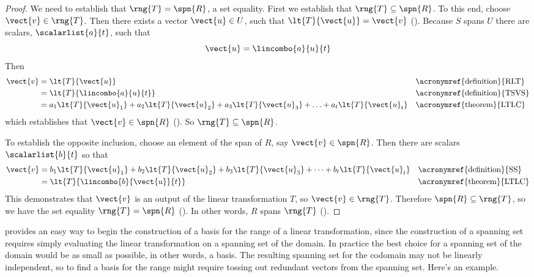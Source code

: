 %
\begin{proof}
We need to establish that $\rng{T}=\spn{R}$, a set equality.  First we establish that $\rng{T}\subseteq\spn{R}$.  To this end, choose $\vect{v}\in\rng{T}$.  Then there exists a vector $\vect{u}\in U$, such that $\lt{T}{\vect{u}}=\vect{v}$ ().  Because $S$ spans $U$ there are scalars, $\scalarlist{a}{t}$, such that
%
\begin{equation*}
\vect{u}=\lincombo{a}{u}{t}
\end{equation*}
%
Then
%
\begin{align*}
\vect{v}
&=\lt{T}{\vect{u}}&&\text{\acronymref{definition}{RLT}}\\
&=\lt{T}{\lincombo{a}{u}{t}}&&\text{\acronymref{definition}{TSVS}}\\
&=a_1\lt{T}{\vect{u}_1}+a_2\lt{T}{\vect{u}_2}+a_3\lt{T}{\vect{u}_3}+\ldots+a_t\lt{T}{\vect{u}_t}&&\text{\acronymref{theorem}{LTLC}}\\
\end{align*}
%
which establishes that $\vect{v}\in\spn{R}$ ().  So $\rng{T}\subseteq\spn{R}$.\par
%
To establish the opposite inclusion, choose an element of the span of $R$, say $\vect{v}\in\spn{R}$.  Then there are scalars $\scalarlist{b}{t}$ so that
%
\begin{align*}
\vect{v}
&=b_1\lt{T}{\vect{u}_1}+b_2\lt{T}{\vect{u}_2}+b_3\lt{T}{\vect{u}_3}+\cdots+b_t\lt{T}{\vect{u}_t}
&&\text{\acronymref{definition}{SS}}\\
&=\lt{T}{\lincombo{b}{\vect{u}}{t}}&&\text{\acronymref{theorem}{LTLC}}
\end{align*}
%
This demonstrates that $\vect{v}$ is an output of the linear transformation $T$, so $\vect{v}\in\rng{T}$.  Therefore $\spn{R}\subseteq\rng{T}$, so we have the set equality $\rng{T}=\spn{R}$ ().  In other words, $R$ spans $\rng{T}$ ().
%
\end{proof}
%
 provides an easy way to begin the construction of a basis for the range of a linear transformation, since the construction of a spanning set requires simply evaluating the linear transformation on a spanning set of the domain.  In practice the best choice for a spanning set of the domain would be as small as possible, in other words, a basis.  The resulting spanning set for the codomain may not be linearly independent, so to find a basis for the range might require tossing out redundant vectors from the spanning set.  Here's an example.
